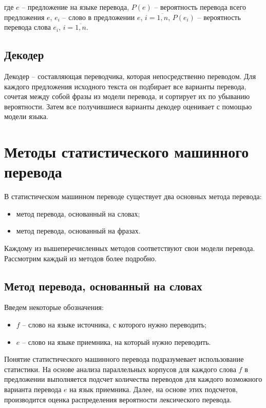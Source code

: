 где $e$ -- предложение на языке перевода, $P(e)$  -- вероятность перевода всего предложения $e$, $e_i$ -- слово в предложении $e$, $i = \overline{1, n}$,   $P(e_i)$ -- вероятность перевода слова $e_i$, $i = \overline{1, n}$.

\subsection{Декодер}

Декодер – составляющая переводчика, которая непосредственно переводом. Для каждого предложения исходного текста он подбирает все варианты перевода, сочетая между собой фразы из модели перевода, и сортирует их по убыванию вероятности. Затем все получившиеся варианты декодер
оценивает с помощью модели языка. 

\clearpage

\section{Методы статистического машинного перевода}

В статистическом машинном переводе существует два основных метода перевода:

\begin{itemize}[label*=--]
	\item метод перевода, основанный на словах;
	\item метод перевода, основанный на фразах.
\end{itemize}

Каждому из вышеперечисленных методов соответствуют свои модели перевода. Рассмотрим каждый из методов более подробно.

\subsection{Метод перевода, основанный на словах}

Введем некоторые обозначения:

\begin{itemize}[label*=--]
	\item $f$ -- слово на языке источника, с которого нужно переводить;
	\item $e$ -- слово на языке приемника, на который нужно переводить.
\end{itemize}

Понятие статистического машинного перевода подразумевает использование статистики. На основе анализа параллельных корпусов для каждого слова $f$ в предложении выполняется подсчет количества переводов для каждого возможного варианта перевода $e$ на язык приемника. Далее, на основе этих подсчетов, производится оценка распределения вероятности лексического перевода. 

